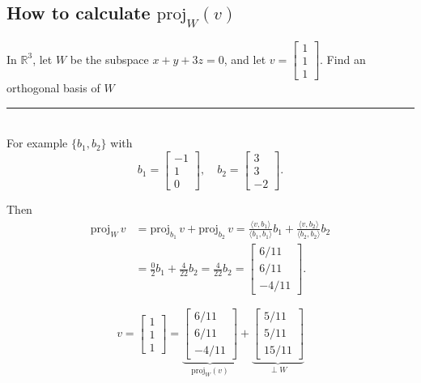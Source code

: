 \documentclass[a4paper, 9pt]{extarticle}
\begin{document}
\subsection{How to calculate $\text{proj}_W(v)$}
\begin{examplebox}{}{}
  In $\mathbb{R}^3$, let $W$ be the subspace $x + y + 3z = 0$, and let $v = \begin{bmatrix} 1 \\ 1 \\ 1 \end{bmatrix}$. Find an orthogonal basis of $W$
  \\ \rule{\textwidth}{1pt}\\
  For example $\{b_1, b_2\}$ with
  $$
    b_1 = \begin{bmatrix} -1 \\ 1 \\ 0 \end{bmatrix}, \quad
    b_2 = \begin{bmatrix} 3 \\ 3 \\ -2 \end{bmatrix}.
  $$

  Then
  \begin{align*}
    \text{proj}_W\,v & = \text{proj}_{b_1}\,v + \text{proj}_{b_2}\,v
    = \frac{\langle v, b_1 \rangle}{\langle b_1, b_1 \rangle} b_1 + \frac{\langle v, b_2 \rangle}{\langle b_2, b_2 \rangle} b_2 \\
                     & = \frac{0}{2} b_1 + \frac{4}{22} b_2 = \frac{4}{22} b_2
    = \begin{bmatrix} 6/11 \\ 6/11 \\ -4/11 \end{bmatrix}.
  \end{align*}

  $$
    v = \begin{bmatrix} 1 \\ 1 \\ 1 \end{bmatrix}
    = \underbrace{\begin{bmatrix} 6/11 \\ 6/11 \\ -4/11 \end{bmatrix}}_{\text{proj}_W(v)}
    + \underbrace{\begin{bmatrix} 5/11 \\ 5/11 \\ 15/11 \end{bmatrix}}_{\perp W}
  $$
\end{examplebox}
\end{document}
